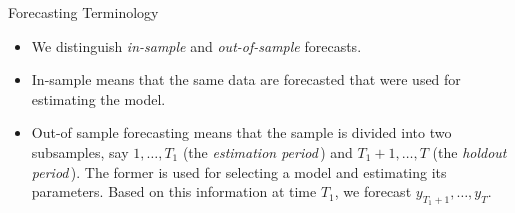 \begin{frame}{Forecasting Terminology}
\begin{itemize}
\item We distinguish \emph{\color{red}in-sample} and \emph{%
\color{red}out-of-sample} forecasts.
\item In-sample means that the same data are forecasted that were used for estimating the model.
\item Out-of sample forecasting means that the sample is divided into two subsamples, say $1,\ldots,T_1$ (the \emph{\color{red}estimation period}\,) and $T_1+1,\ldots,T$ (the \emph{\color{red}holdout period}\,). The former is used for selecting a model and
estimating its parameters. Based on this information at time $T_1$, we forecast $%
y_{T_1+1},\ldots ,y_{T}$.



\end{itemize}\end{frame}
%
%
%
